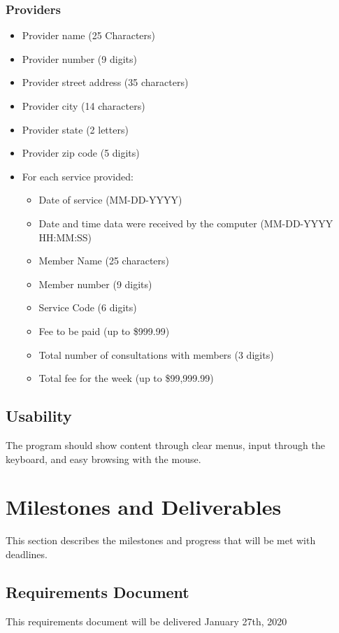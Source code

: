 \documentclass{article}
\begin{document}
\subsubsection{Providers}
\begin{itemize}
\item Provider name (25 Characters)
\item Provider number (9 digits)
\item Provider street address (35  characters)
\item Provider city (14 characters)
\item Provider state (2 letters)
\item Provider zip code (5 digits)
\item For each service provided:
\begin{itemize}
\item Date of service (MM-DD-YYYY)
\item Date and time data were received by the computer (MM-DD-YYYY HH:MM:SS)
\item Member Name (25 characters)
\item Member number (9 digits)
\item Service Code (6 digits)
\item Fee to be paid (up to \$999.99)
\item Total number of consultations with members (3 digits)
\item Total fee for the week (up to \$99,999.99)
\end{itemize}
\end{itemize}

\subsection{Usability}
The program should show content through clear menus, input through the keyboard, and easy browsing with the mouse.




\section{Milestones and Deliverables}
This section describes the milestones and progress that will be met with deadlines.


\subsection{Requirements Document}
This requirements document will be delivered January 27th, 2020
\end{document}

